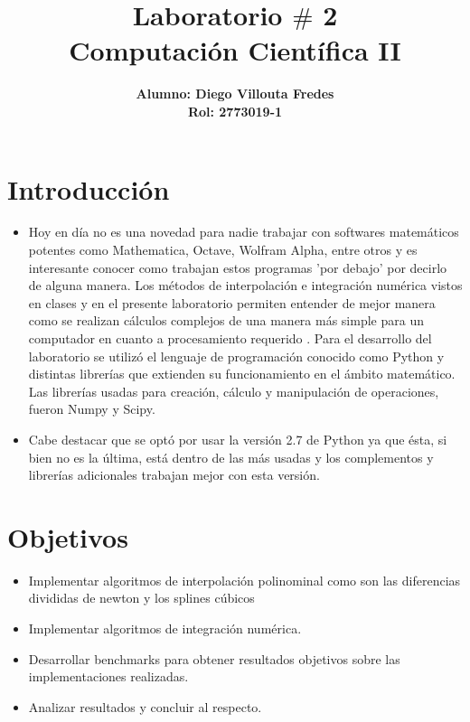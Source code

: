 \documentclass[letter, 10pt]{article}
\title{Laboratorio $\#$ 2\\
       Computaci\'on Cient\'ifica II\\}
\author{\bf Alumno: Diego Villouta Fredes\\
\bf Rol: 2773019-1}
\begin{document}
\begin{titlepage}
\maketitle
\thispagestyle{empty}
\end{titlepage}

\tableofcontents

\newpage

\section{ Introducci\'on }

\begin{itemize}

\item Hoy en d\'ia no es una novedad para nadie trabajar con softwares matem\'aticos potentes como Mathematica, Octave, Wolfram Alpha, entre otros y es interesante conocer como trabajan estos programas 'por debajo' por decirlo de alguna manera. Los m\'etodos de interpolaci\'on e integraci\'on num\'erica vistos en clases y en el presente laboratorio permiten entender de mejor manera como se realizan c\'alculos complejos de una manera m\'as simple para un computador en cuanto a procesamiento requerido . Para el desarrollo del laboratorio se utiliz\'o el lenguaje de programaci\'on conocido como Python y distintas librer\'ias que extienden su funcionamiento en el \'ambito matem\'atico. Las librer\'ias usadas para creaci\'on, c\'alculo y manipulaci\'on de operaciones, fueron Numpy y Scipy.

\item Cabe destacar que se opt\'o por usar la versi\'on 2.7 de Python ya que \'esta, si bien no es la \'ultima, est\'a dentro de las m\'as usadas y los complementos y librer\'ias adicionales trabajan mejor con esta versi\'on.

\end{itemize}

\section{ Objetivos }

\begin{itemize}
\item Implementar algoritmos de interpolaci\'on polinominal como son las diferencias divididas de newton y los splines c\'ubicos
\item Implementar algoritmos de integraci\'on num\'erica.
\item Desarrollar benchmarks para obtener resultados objetivos sobre las implementaciones realizadas.
\item Analizar resultados y concluir al respecto.
\end{itemize}
\end{document}
